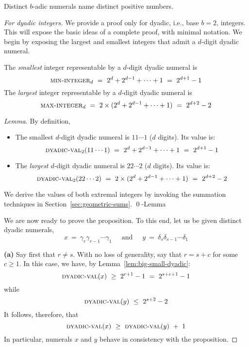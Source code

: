 \begin{prop}
\label{thm:adic-bijective}
Distinct $b$-adic numerals name distinct positive numbers.
\end{prop}

\begin{proof}[For dyadic integers]
We provide a proof only for dyadic, i.e., base $b=2$, integers.  This
will expose the basic ideas of a complete proof, with minimal
notation.  We begin by exposing the largest and smallest integers that
admit a $d$-digit dyadic numeral.

\begin{lemma}
\label{lem:big-small-dyadic}
The {\em smallest} integer representable by a $d$-digit dyadic
numeral is 
\[ \mbox{\sc min-integer}_d \ = \ 2^d + 2^{d-1} + \cdots + 1 \ = \ 2^{d+1} - 1
\]
The {\em largest} integer representable by a $d$-digit dyadic
numeral is
\[ \mbox{\sc max-integer}_d \ = \
2 \times (2^d + 2^{d-1} + \cdots + 1) \ = \ 2^{d+2} - 2
\]
\end{lemma}

\begin{proof}[Lemma]
By definition,
\begin{itemize}
\item
The smallest $d$-digit dyadic numeral is $11 \cdots 1$ ($d$ digits).
Its value is:
\[ \mbox{\sc dyadic-val}_2(11 \cdots 1)
 \ = \ 2^d + 2^{d-1} + \cdots + 1 \ = \ 2^{d+1} - 1 \]
\item
The {\em largest} $d$-digit dyadic numeral is 
$22 \cdots 2$ ($d$ digits).  Its value is:
\[ \mbox{\sc dyadic-val}_2(22 \cdots 2)
\ = \ 2 \times (2^d + 2^{d-1} + \cdots + 1) \ = \ 2^{d+2} - 2 \]
\end{itemize}
We derive the values of both extremal integers by invoking the
summation techniques in Section~\ref{sec:geometric-sums}.
\qed-Lemma
\end{proof}

\bigskip

We are now ready to prove the proposition.  To this end, let us be
given distinct dyadic numerals,
\[
x \ = \ \gamma_r \gamma_{r-1} \cdots \gamma_1
 \ \ \ \ \ \mbox{ and } \ \ \ \ \
y \ = \ \delta_s \delta_{s-1} \cdots \delta_1
\]

{\bf (a)} Say first that $r \neq s$.  With no loss of generality, say
that $r = s +c$ for some $c \geq 1$.  In this case, we have, by
Lemma~\ref{lem:big-small-dyadic}:
\[ \mbox{\sc dyadic-val}(x) \ \geq \ 2^{r+1} - 1 \ = \ 2^{s+c+1} -1 \]
while
\[ \mbox{\sc dyadic-val}(y) \ \leq \ 2^{s+2} - 2 \]
It follows, therefore, that
\[ \mbox{\sc dyadic-val}(x) \ \geq \ \mbox{\sc dyadic-val}(y) \ + \ 1 \]
In particular, numerals $x$ and $y$ behave in consistency with the
proposition.


\end{proof}
